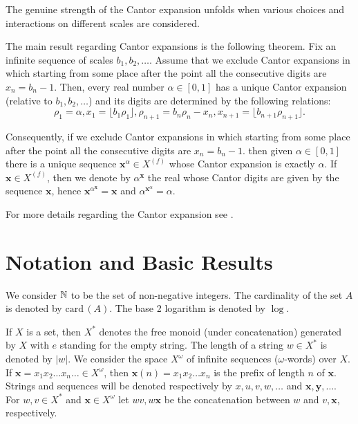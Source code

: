 \documentclass[12pt]{iopart}
\begin{document}
The genuine strength of the Cantor expansion unfolds
when various choices and  interactions on different scales are
considered.

The main result regarding Cantor expansions is the following theorem.
Fix an infinite sequence of scales $b_1, b_2, \ldots$.  Assume that we
exclude Cantor expansions in which starting from some place after the point
all the consecutive digits are $x_n = b_n -1$. Then, every real number
$\alpha\in [0,1]$ has  a unique Cantor expansion (relative to $b_1, b_2,
\ldots$)
and its digits are determined by the following relations:
\[ \rho_1 = \alpha, x_1 = \lfloor b_1 \rho_1\rfloor, \rho_{n+1} = b_n \rho_n
- x_n, x_{n+1} = \lfloor b_{n+1} \rho_{n+1}\rfloor.\]


Consequently, if we exclude Cantor expansions in which starting from some
place after the point all the consecutive digits are $x_n = b_n -1$. then
given $\alpha \in [0,1]$ there is a unique sequence ${\mathbf x}^{\alpha}\in {X^{(f)}}$
whose Cantor expansion is exactly $\alpha$. If ${\mathbf x} \in {X^{(f)}}$, then we denote
by $\alpha^{{\mathbf x}}$ the real whose Cantor digits are given by the sequence
${\mathbf x}$, hence ${\mathbf x}^{\alpha^{{\mathbf x}}} = {\mathbf x}$ and $ \alpha^{{\mathbf x}^{\alpha}}
 = \alpha$.

For more
details regarding the Cantor expansion see \cite{hardy-54,drobot}.




\section{Notation and Basic Results}

We consider ${\Bbb N}$ to be the set of non-negative integers. The
cardinality of the set $A$ is denoted by ${\mathrm{card}\,}(A)$.  The base 2 logarithm
is denoted by
$\log$.

If $X$ is a  set, then $X^*$ denotes the free monoid (under concatenation)
generated by $X$ with $e$ standing for the empty string. The length of a
string $w \in X^*$ is denoted by $|w|$. We consider the space $X^\omega$ of
infinite sequences ($\omega$-words)
over $X$. If ${\mathbf x} = x_{1}x_{2}\ldots x_{n}\ldots \in X^{\omega}$, then
${\mathbf x}(n)=
x_{1}x_{2}\ldots x_{n} $ is the prefix of length $n$ of ${\mathbf x}$. Strings and
sequences will be denoted respectively by $x, u,v,w, \ldots$ and   ${\mathbf x},
{\mathbf y},
\ldots$. For $w, v\in X^*$ and ${\mathbf x} \in X^\omega$ let  $wv, w{\mathbf x}$ be the
concatenation between $w$ and $v, {\mathbf x}$, respectively.
\end{document}
